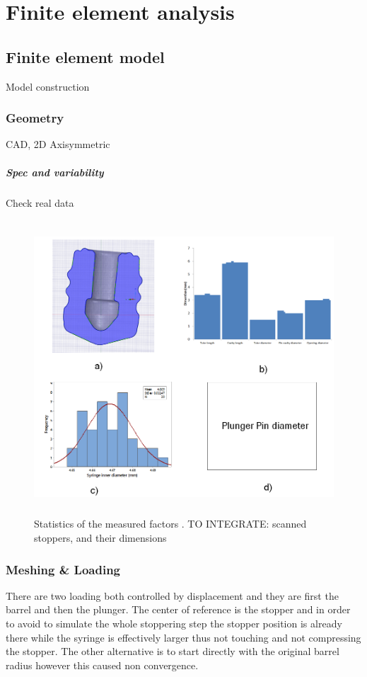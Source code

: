 \newpage
\section{Finite element analysis}

\subsection{Finite element model}
Model construction

\subsubsection{Geometry}

CAD, 2D Axisymmetric

\subparagraph*{Spec and variability}
Check real data
\begin{figure}[h!]	
	\centering
\includegraphics[height=11cm]{img/spec.PNG}
   \caption{Statistics of the measured factors . TO INTEGRATE: scanned stoppers, and their dimensions}
 \label{fgr:PFS}
\end{figure}

\newpage

\subsubsection{Meshing \& Loading}

There are two loading both controlled by displacement and they are first the barrel and then the plunger. The center of reference is the stopper and in order to avoid to simulate the whole stoppering step the stopper position is already there while the syringe is effectively larger thus not touching and not compressing the stopper. The other alternative is to start directly with the original barrel radius however this caused non convergence.


